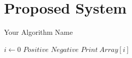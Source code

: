 \fancyhead[RE]{\fontsize{8}{12}\selectfont\leftmark}
\chapter{Proposed System}
\label{pwork}



\begin{algorithm}[H]
\caption{Your Algorithm Name}
\begin{algorithmic}[1]
	\State $i\leftarrow 0$
    	\State $Positive$
    \Else
    	\State $Negative$
     \EndIf
     	\State $Print~Array[i]$
     \EndFor
\EndProcedure
\end{algorithmic}
\end{algorithm}








	